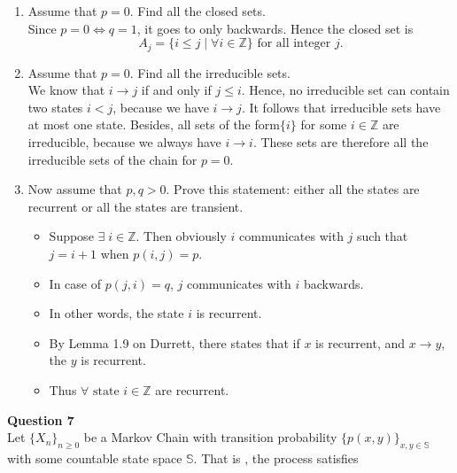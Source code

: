 \documentclass[12pt]{article}
\begin{document}
\begin{enumerate}[label=(\alph*)]
    \item Assume that $p = 0$. Find all the closed sets.\\
    
        Since $p=0\Leftrightarrow q=1$, it goes to only backwards. Hence the closed set is 
        $$A_j = \{i \le j\;|\;\forall i \in \mathbb{Z} \} \text{ for all integer $j$}.$$
    \item Assume that $p = 0$. Find all the irreducible sets.\\
    
        We know that $i\to j$ if and only if $j\le i$. Hence, no irreducible set can contain two states $i<j$, because we have $i\to j$. It follows that irreducible sets have at most one state. Besides, all sets of the form$\{i\}$ for some $i\in \mathbb{Z}$ are irreducible, because we always have $i\to i$. These sets are therefore all the irreducible sets of the chain for $p=0$.
    

    \item Now assume that $p, q > 0$. Prove this statement: either all the states are recurrent or all the states are transient.
        \begin{itemize}
            \item Suppose $\exists\; i \in \mathbb{Z}$. Then obviously $i$ communicates with $j$ such that $j = i + 1$ when $p(i,j) = p$. 
            \item In case of $p(j,i) = q$, $j$ communicates with $i$ backwards.
            \item In other words, the state $i$ is recurrent. 
            \item By Lemma 1.9 on Durrett, there states that if $x$ is recurrent, and $x \rightarrow y$, the $y$ is recurrent. 
            \item Thus $\forall \text{ state $i$} \in \mathbb{Z}$ are recurrent.
        \end{itemize}        
        
\end{enumerate}


\vspace{1.5\baselineskip}
\noindent

\newpage
\noindent
\textbf{Question 7}\\
Let $\{X_n\}_{n\ge 0}$ be a Markov Chain with transition probability $\{p(x,y)\}_{x,y\in \mathbb{S}}$ with some countable state space $\mathbb{S}$. That is , the process satisfies
\end{document}
